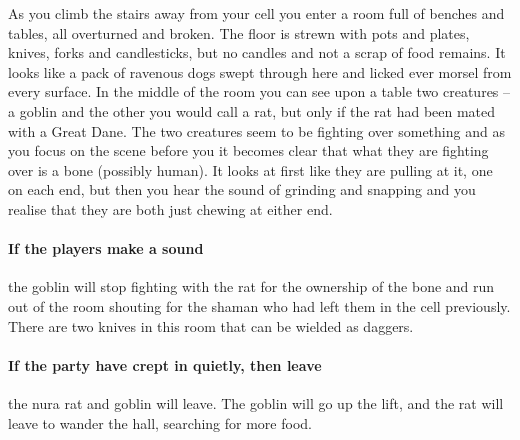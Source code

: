 \begin{multicols}{2}

\begin{boxtext}

	As you climb the stairs away from your cell you enter a room full of benches and tables, all overturned and broken. 
	The floor is strewn with pots and plates, knives, forks and candlesticks, but no candles and not a scrap of food remains.
	It looks like a pack of ravenous dogs swept through here and licked ever morsel from every surface.
	In the middle of the room you can see upon a table two creatures -- a goblin and the other you would call a rat, but only if the rat had been mated with a Great Dane.
	The two creatures seem to be fighting over something and as you focus on the scene before you it becomes clear that what they are fighting over is a bone (possibly human).
	It looks at first like they are pulling at it, one on each end, but then you hear the sound of grinding and snapping and you realise that they are both just chewing at either end.

\end{boxtext}

\paragraph{If the players make a sound}
the goblin will stop fighting with the rat for the ownership of the bone and run out of the room shouting for the shaman who had left them in the cell previously.
There are two knives in this room that can be wielded as daggers.

\paragraph{If the party have crept in quietly, then leave}
the nura rat and goblin will leave.
The goblin will go up the lift, and the rat will leave to wander the hall, searching for more food.






\end{multicols}
